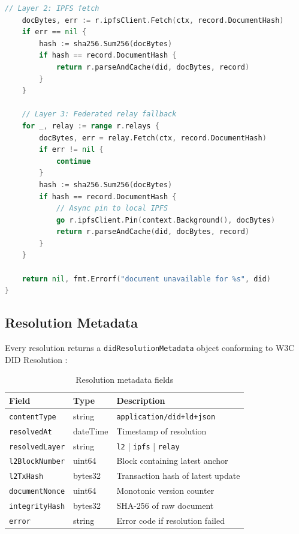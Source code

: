 \documentclass[11pt,a4paper]{article}
\begin{document}
\begin{lstlisting}[language=Go,caption={Go resolver implementation}]
    // Layer 2: IPFS fetch
    docBytes, err := r.ipfsClient.Fetch(ctx, record.DocumentHash)
    if err == nil {
        hash := sha256.Sum256(docBytes)
        if hash == record.DocumentHash {
            return r.parseAndCache(did, docBytes, record)
        }
    }

    // Layer 3: Federated relay fallback
    for _, relay := range r.relays {
        docBytes, err = relay.Fetch(ctx, record.DocumentHash)
        if err != nil {
            continue
        }
        hash := sha256.Sum256(docBytes)
        if hash == record.DocumentHash {
            // Async pin to local IPFS
            go r.ipfsClient.Pin(context.Background(), docBytes)
            return r.parseAndCache(did, docBytes, record)
        }
    }

    return nil, fmt.Errorf("document unavailable for %s", did)
}
\end{lstlisting}

\subsection{Resolution Metadata}

Every resolution returns a \texttt{didResolutionMetadata} object conforming to
W3C DID Resolution \cite{w3c-did-resolution}:

\begin{table}[h]
\centering
\caption{Resolution metadata fields}
\label{tab:resolution-metadata}
\begin{tabular}{lll}
\toprule
\textbf{Field} & \textbf{Type} & \textbf{Description} \\
\midrule
\texttt{contentType} & string & \texttt{application/did+ld+json} \\
\texttt{resolvedAt} & dateTime & Timestamp of resolution \\
\texttt{resolvedLayer} & string & \texttt{l2} | \texttt{ipfs} | \texttt{relay} \\
\texttt{l2BlockNumber} & uint64 & Block containing latest anchor \\
\texttt{l2TxHash} & bytes32 & Transaction hash of latest update \\
\texttt{documentNonce} & uint64 & Monotonic version counter \\
\texttt{integrityHash} & bytes32 & SHA-256 of raw document \\
\texttt{error} & string & Error code if resolution failed \\
\bottomrule
\end{tabular}
\end{table}
\end{document}
